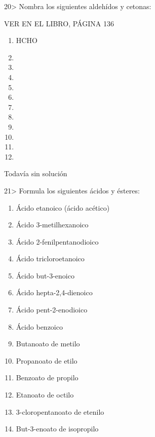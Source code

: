 \documentclass{article}
\begin{document}
\begin{exercise}
  20> Nombra los siguientes aldehídos y cetonas:

  VER EN EL LIBRO, PÁGINA 136
  \begin{enumerate}
    \item HCHO
    \item {}
    \item {}
    \item {}
    \item {}
    \item {}
    \item {}
    \item {}
    \item {}
    \item {}
    \item {}
    \item {}
  \end{enumerate}

\end{exercise}

\begin{solution}[print=false]
  Todavía sin solución
\end{solution}

\begin{exercise}
  21> Formula los siguientes ácidos y ésteres:
  \begin{enumerate}
    \item Ácido etanoico (ácido acético)
    \item Ácido 3-metilhexanoico
    \item Ácido 2-fenilpentanodioico
    \item Ácido tricloroetanoico
    \item Ácido but-3-enoico
    \item Ácido hepta-2,4-dienoico
    \item Ácido pent-2-enodioico
    \item Ácido benzoico
    \item Butanoato de metilo
    \item Propanoato de etilo
    \item Benzoato de propilo
    \item Etanoato de octilo
    \item 3-cloropentanoato de etenilo
    \item But-3-enoato de isopropilo
  \end{enumerate}
\end{exercise}
\end{document}
